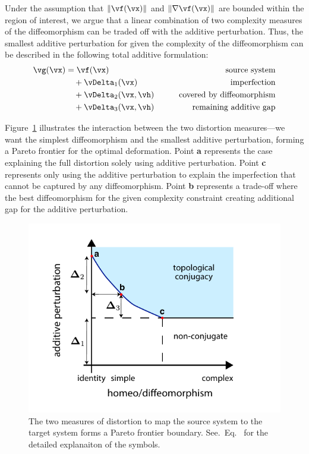 \documentclass[a4paper,twoside]{article}
\renewcommand{\eqref}{Eq.~\originaleqref}
\newcounter{ct}
\DeclarePairedDelimiter{\norm}{\lVert}{\rVert}
\newcommand{\homeo}{\vh}
\begin{document}
Under the assumption that $\norm{\vf(\vx)}$ and $\norm{\nabla\vf(\vx)}$ are bounded within the region of interest, we argue that a linear combination of two complexity measures of the diffeomorphism can be traded off with the additive perturbation.
Thus, the smallest additive perturbation for given the complexity of the diffeomorphism can be described in the following total additive formulation:
\begin{align}\label{eq:decomp:triple}
    \vg(\vx) &= 
	\vf(\vx)
	&\qquad\text{source system}
	\\
	&\quad+\vDelta_1(\vx)
	&\qquad\text{imperfection}
	\\
	&\quad+\vDelta_2(\vx, \homeo)
	&\qquad\text{covered by diffeomorphism}
	\\
	&\quad+\vDelta_3(\vx, \homeo)
	&\qquad\text{remaining additive gap}
\end{align}

Figure~\ref{fig:pareto} illustrates the interaction between the two distortion measures---we want the simplest diffeomorphism and the smallest additive perturbation, forming a Pareto frontier for the optimal deformation.
Point \textbf{a} represents the case explaining the full distortion solely using additive perturbation.
Point \textbf{c} represents only using the additive perturbation to explain the imperfection that cannot be captured by any diffeomorphism.
Point \textbf{b} represents a trade-off where the best diffeomorphism for the given complexity constraint creating additional gap for the additive perturbation.

\begin{figure}[htbp]
\centering
\includegraphics{pareto}
\caption{The two measures of distortion to map the source system to the target system forms a Pareto frontier boundary.
See.~\eqref{eq:decomp:triple} for the detailed explanaiton of the symbols.
}
\label{fig:pareto}
\end{figure}
\end{document}

